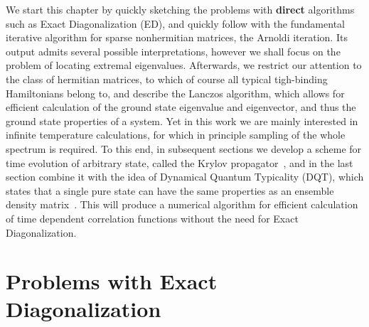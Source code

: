 We start this chapter by quickly sketching the problems with \textbf{direct} algorithms such as Exact Diagonalization (ED), and quickly
follow with the fundamental iterative algorithm for sparse nonhermitian matrices, the Arnoldi iteration. Its output admits several
possible interpretations, however we shall focus on the problem of locating extremal eigenvalues.
Afterwards, we restrict our attention to the class of hermitian matrices, to which of course all typical tigh-binding Hamiltonians
belong to, and describe the Lanczos algorithm, which allows for efficient calculation of the ground state eigenvalue and eigenvector,
and thus the ground state properties of a system.
Yet in this work we are mainly interested in infinite temperature calculations, for which in principle sampling of the whole
spectrum is required. To this end, in subsequent sections we develop a scheme for time evolution of arbitrary state,
called the Krylov propagator~\autocite{Park1986}, and in the last section combine it with the idea of Dynamical Quantum Typicality (DQT),
which states that a single pure state can have the same properties as an ensemble density matrix~\autocite{Gemmer2003,Goldstein2006,Popescu2006}.
This will produce a numerical algorithm for efficient calculation of time dependent correlation functions without the need
for Exact Diagonalization.

 \section{Problems with Exact Diagonalization}

